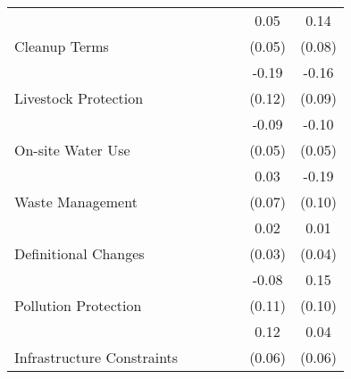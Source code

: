 \begin{tabular}{lcccccc}
 & \phantom{X} & \phantom{X} & \phantom{X} & \phantom{X} & 0.05 & 0.14\\

\multirow{-2}{*}{\raggedright\arraybackslash Cleanup Terms} & \phantom{X} & \phantom{X} & \phantom{X} & \phantom{X} & (0.05) & (0.08)\\

 & \phantom{X} & \phantom{X} & \phantom{X} & \phantom{X} & -0.19 & -0.16\\

\multirow{-2}{*}{\raggedright\arraybackslash Livestock Protection} & \phantom{X} & \phantom{X} & \phantom{X} & \phantom{X} & (0.12) & (0.09)\\

 & \phantom{X} & \phantom{X} & \phantom{X} & \phantom{X} & -0.09 & -0.10\\

\multirow{-2}{*}{\raggedright\arraybackslash On-site Water Use} & \phantom{X} & \phantom{X} & \phantom{X} & \phantom{X} & (0.05) & (0.05)\\

 & \phantom{X} & \phantom{X} & \phantom{X} & \phantom{X} & 0.03 & -0.19\\

\multirow{-2}{*}{\raggedright\arraybackslash Waste Management} & \phantom{X} & \phantom{X} & \phantom{X} & \phantom{X} & (0.07) & (0.10)\\

 & \phantom{X} & \phantom{X} & \phantom{X} & \phantom{X} & 0.02 & 0.01\\

\multirow{-2}{*}{\raggedright\arraybackslash Definitional Changes} & \phantom{X} & \phantom{X} & \phantom{X} & \phantom{X} & (0.03) & (0.04)\\

 & \phantom{X} & \phantom{X} & \phantom{X} & \phantom{X} & -0.08 & 0.15\\

\multirow{-2}{*}{\raggedright\arraybackslash Pollution Protection} & \phantom{X} & \phantom{X} & \phantom{X} & \phantom{X} & (0.11) & (0.10)\\

 & \phantom{X} & \phantom{X} & \phantom{X} & \phantom{X} & 0.12 & 0.04\\

\multirow{-2}{*}{\raggedright\arraybackslash Infrastructure Constraints} & \phantom{X} & \phantom{X} & \phantom{X} & \phantom{X} & (0.06) & (0.06)\\


\end{tabular}
